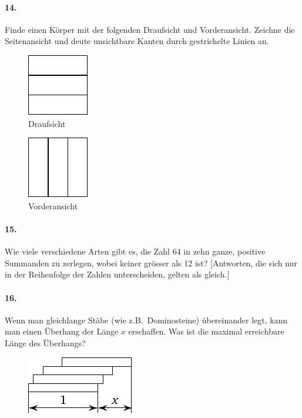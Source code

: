 \documentclass[10pt,a5paper,twoside]{article}
\newenvironment{problem}[1]{\paragraph*{#1}}{}
\begin{document}
\begin{problem}{14.}
	Finde einen Körper mit der folgenden Draufsicht und Vorderansicht. Zeichne die Seitenansicht und deute unsichtbare Kanten durch gestrichelte Linien an. 
	\begin{figure}[H]
	\footnotesize
	\null\hfill
	\parbox{0.2\linewidth}{\centering\includegraphics[scale=1]{taskbook-99}\\Draufsicht}
	\hfill
	\parbox{0.2\linewidth}{\centering\includegraphics[scale=1]{taskbook-98}\\Vorderansicht}
	\hfill\null
	\end{figure}
\end{problem}

\begin{problem}{15.}
	Wie viele verschiedene Arten gibt es, die Zahl 64 in zehn ganze, positive Summanden zu zerlegen, wobei keiner grösser als 12 ist?
	[Antworten, die sich nur in der Reihenfolge der Zahlen unterscheiden, gelten als gleich.]
\end{problem}

\begin{problem}{16.}
	Wenn man gleichlange Stäbe (wie z.B.\ Dominosteine) übereinander legt, kann man einen Überhang der Länge $x$ erschaffen. Was ist die maximal er\-reich\-ba\-re Länge des Überhangs? 
	\begin{figure}[H]
	\centering
	\includegraphics[scale=1]{taskbook-97}
	\end{figure}
\end{problem}
\end{document}
